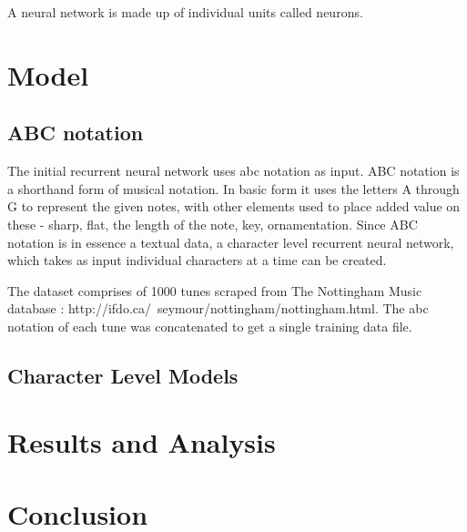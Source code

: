 \documentclass[11pt]{article}
\begin{document}
A neural network is made up of individual units called neurons.
\section{Model}
\subsection{ABC notation}
The initial recurrent neural network uses abc notation as input. ABC notation is a shorthand form of musical notation. In basic form it uses the letters A through G to represent the given notes, with other elements used to place added value on these - sharp, flat, the length of the note, key, ornamentation. Since ABC notation is in essence a textual data, a character level recurrent neural network, which takes as input individual characters at a time can be created.

The dataset comprises of 1000 tunes scraped from The Nottingham Music database : http://ifdo.ca/~seymour/nottingham/nottingham.html. The abc notation of each tune was concatenated to get a single training data file.

\subsection{Character Level Models}


\section{Results and Analysis}
\section{Conclusion}
\end{document}
